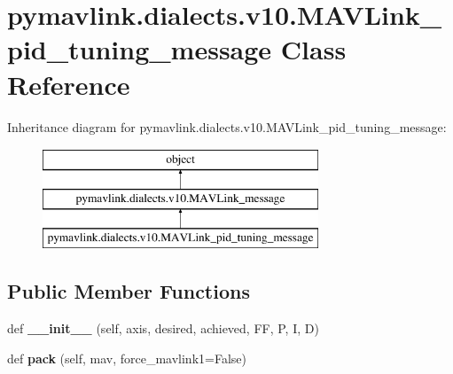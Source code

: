 \hypertarget{classpymavlink_1_1dialects_1_1v10_1_1MAVLink__pid__tuning__message}{}\section{pymavlink.\+dialects.\+v10.\+M\+A\+V\+Link\+\_\+pid\+\_\+tuning\+\_\+message Class Reference}
\label{classpymavlink_1_1dialects_1_1v10_1_1MAVLink__pid__tuning__message}
Inheritance diagram for pymavlink.\+dialects.\+v10.\+M\+A\+V\+Link\+\_\+pid\+\_\+tuning\+\_\+message\+:\begin{figure}[H]
\begin{center}
\leavevmode
\includegraphics[height=3.000000cm]{classpymavlink_1_1dialects_1_1v10_1_1MAVLink__pid__tuning__message}
\end{center}
\end{figure}
\subsection*{Public Member Functions}
\begin{DoxyCompactItemize}
\item 
\mbox{\label{classpymavlink_1_1dialects_1_1v10_1_1MAVLink__pid__tuning__message_a2bf007ec7f3ba0c3ebee191bd45676c3}} 
def {\bfseries \+\_\+\+\_\+init\+\_\+\+\_\+} (self, axis, desired, achieved, FF, P, I, D)
\item 
\mbox{\label{classpymavlink_1_1dialects_1_1v10_1_1MAVLink__pid__tuning__message_a766bb902be61c83e148e4ac46cf80ea2}} 
def {\bfseries pack} (self, mav, force\+\_\+mavlink1=False)
\end{DoxyCompactItemize}
